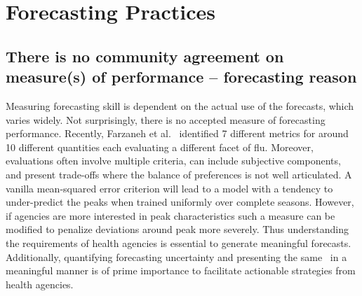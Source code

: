 \documentclass[10pt,letterpaper]{article}
\begin{document}
\section*{Forecasting Practices}

\subsection*{There is no community agreement on measure(s) of performance
– forecasting reason}
Measuring forecasting skill is dependent on the actual use of the forecasts,
which varies widely. Not surprisingly, there is no accepted measure of
forecasting performance. Recently, Farzaneh et al.~\cite{tabataba2015smq}
identified 7 different metrics for around 10 different quantities each
evaluating a different facet of flu.
Moreover, evaluations often involve multiple criteria, can include subjective
components, and present trade-offs where the balance of preferences is not well
articulated. A vanilla mean-squared error criterion will lead to a model with a
tendency to under-predict the peaks when trained uniformly over complete
seasons. However, if agencies are more interested in peak characteristics such
a measure can be modified to penalize deviations around peak more severely.
Thus understanding the requirements of health agencies is essential to generate
meaningful forecasts. Additionally, quantifying forecasting uncertainty and
presenting the same~\cite{tabataba2015smq} in a meaningful manner is of prime importance to
facilitate actionable strategies from health agencies.

\end{document}
